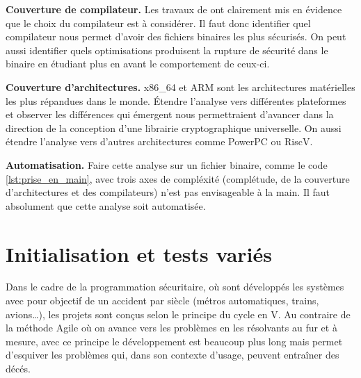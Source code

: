 \textbf{Couverture de compilateur.} Les travaux de \citeauthor{schneider2024breakingbadcompilersbreak} \cite{schneider2024breakingbadcompilersbreak} ont clairement mis en évidence que le choix du compilateur est à considérer. Il faut donc identifier quel compilateur nous permet d'avoir des fichiers binaires les plus sécurisés. On peut aussi identifier quels optimisations produisent la rupture de sécurité dans le binaire en étudiant plus en avant le comportement de ceux-ci.

\textbf{Couverture d'architectures.} x86\_64 et ARM sont les architectures matérielles les plus répandues dans le monde. Étendre l'analyse vers différentes plateformes et observer les différences qui émergent nous permettraient d'avancer dans la direction de la conception d'une librairie cryptographique universelle. On aussi étendre l'analyse vers d'autres architectures comme PowerPC ou RiscV.\medbreak


\textbf{Automatisation.} Faire cette analyse sur un fichier binaire, comme le code \ref{lst:prise_en_main}, avec trois axes de compléxité (complétude, de la couverture d'architectures et des compilateurs) n'est pas envisageable à la main. Il faut absolument que cette analyse soit automatisée.


\section{Initialisation et tests variés}

Dans le cadre de la programmation sécuritaire, où sont développés les systèmes avec pour objectif de un accident par siècle (métros automatiques, trains, avions\dots), les projets sont conçus selon le principe du cycle en V. Au contraire de la méthode Agile où on avance vers les problèmes en les résolvants au fur et à mesure, avec ce principe le développement est beaucoup plus long mais permet d'esquiver les problèmes qui, dans son contexte d'usage, peuvent entraîner des décés.


